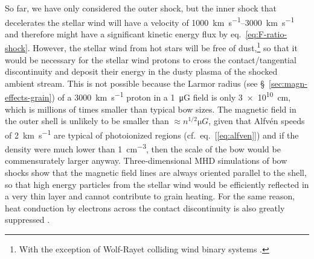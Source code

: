 So far, we have only considered the outer shock, but the inner shock
that decelerates the stellar wind will have a velocity of
\SIrange{1000}{3000}{km.s^{-1}} and therefore might have a
significant kinetic energy flux by eq.~\eqref{eq:F-ratio-shock}.
However, the stellar wind from hot stars will be free of
dust,\footnote{%
  With the exception of Wolf-Rayet colliding wind binary systems
  \citep{Tuthill:1999a, Callingham:2019a}.} %
so that it would be necessary for the stellar wind protons to cross
the contact/tangential discontinuity and deposit their energy in the
dusty plasma of the shocked ambient stream.  This is not possible
because the Larmor radius (see \S~\ref{sec:magn-effects-grain}) of a
\SI{3000}{km.s^{-1}} proton in a \SI{1}{\micro G} field is only
\SI{3e10}{cm}, which is millions of times smaller than typical bow
sizes.  The magnetic field in the outer shell is unlikely to be
smaller than \(\approx n^{1/2} \si{\micro G}\), given that Alfvén
speeds of \SI{2}{km.s^{-1}} are typical of photoionized regions
(cf.~eq.~[\ref{eq:alfven}]) and if the density were much lower than
\SI{1}{cm^{-3}}, then the scale of the bow would be commensurately
larger anyway.  Three-dimensional MHD simulations of bow shocks
\citep{Katushkina:2017a, Gvaramadze:2018a} show that the magnetic
field lines are always oriented parallel to the shell, so that high
energy particles from the stellar wind would be efficiently reflected
in a very thin layer and cannot contribute to grain heating.  For the
same reason, heat conduction by electrons across the contact
discontinuity is also greatly suppressed \citep{Meyer:2017a}.





